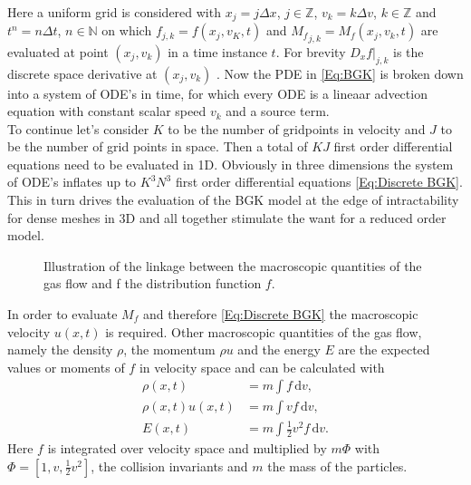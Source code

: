 \documentclass[12pt, a4paper]{article}
\begin{document}
Here a uniform grid is considered with \(x_j = j\Delta x\), \(j \in \mathbb{Z}\), \(v_k = k\Delta v\), \(k \in \mathbb{Z}\) and \(t^n = n \Delta t\), \(n \in \mathbb{N}\) on which \(f_{j,k} = f(x_j,v_K,t)\) and \({M_f}_{j,k} = M_f(x_j,v_k,t)\) are evaluated at point \((x_j,v_k)\) in a time instance \(t\). For brevity \(D_x f|_{j,k}\) is the discrete space derivative at \((x_j,v_k)\) \cite{puppo2019kinetic}. Now the PDE in \cref{Eq:BGK} is broken down into a system of ODE's in time, for which every ODE is a lineaar advection equation with constant scalar speed \(v_k\) and a source term.\\ 
To continue let's consider \(K\) to be the number of gridpoints in velocity and \(J\) to be the number of grid points in space. Then a total of \(KJ\) first order differential equations need to be evaluated in 1D. Obviously in three dimensions the system of ODE's inflates up to \(K^3N^3\) first order differential equations \cref{Eq:Discrete BGK}. This in turn drives the evaluation of the BGK model at the edge of intractability for dense meshes in 3D and all together stimulate the want for a reduced order model.\\
\begin{figure}
	\vspace{-10pt}
	\begin{center}
		\scalebox{.9}{}
	\end{center}
	\caption{Illustration of the linkage between the macroscopic quantities of the gas flow and f the distribution function \(f\).}
	\vspace{-100pt}
	\label{Fig:Demo Macro}
\end{figure}
In order to evaluate \(M_f\) and therefore \cref{Eq:Discrete BGK} the macroscopic velocity \(u(x,t)\) is required. Other macroscopic quantities of the gas flow, namely  the density \(\rho\), the momentum \(\rho u\) and the energy \(E\) are the expected values or moments of \(f\) in velocity space and can be calculated with \cite{puppo2019kinetic} 
\begin{align}
	\rho(x,t) &= m \int\! f \,\mathrm{d}v \mathrm{,} \label{Eq:Mom1}
	\\
	\rho(x,t) u(x,t) &= m \int\! v f \,\mathrm{d}v \mathrm{,} \label{Eq:Mom2}
	\\
	E(x,t) &= m \int\! \frac{1}{2}v^2 f  \,\mathrm{d}v \mathrm{.} \label{Eq:Mom:3}
\end{align}
Here \(f\) is integrated over velocity space and multiplied by \(m\Phi\) with \(\Phi = [1,v,\frac{1}{2} v^2]\), the collision invariants and \(m\) the mass of the particles.\\ 
\end{document}
